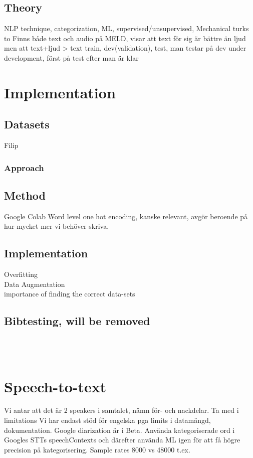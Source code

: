 \documentclass[nofilelist]{cslthse-msc}
\begin{document}
\section{Theory}
NLP technique, categorization, ML, supervised/unsupervised,  
Mechanical turks to 
Finns både text och audio på MELD, \citep{zhang2019modeling} visar att text för sig är bättre än ljud men att text+ljud > text
train, dev(validation), test, man testar på dev under development, först på test efter man är klar

\chapter{Implementation}

\section{Datasets}
Filip
\subsection{Approach} 
\section{Method}
Google Colab
Word level one hot encoding, kanske relevant, avgör beroende på hur mycket mer vi behöver skriva.
\section{Implementation}
Overfitting \\
Data Augmentation \\
importance of finding the correct data-sets \\
\section{Bibtesting, will be removed}
\citep{emotionlinesdataset} \\
\citep{franoischollet2017learning}\\
\citep{beaver2020towards}
\chapter{Speech-to-text}
Vi antar att det är 2 speakers i samtalet, nämn för- och nackdelar. Ta med i limitations
Vi har endast stöd för engelska pga limits i datamängd, dokumentation. 
Google diarization är i Beta.
Använda kategoriserade ord i Googles STTs speechContexts och därefter använda ML igen för att få högre precision på kategorisering. 
Sample rates 8000 vs 48000 t.ex.
\end{document}
